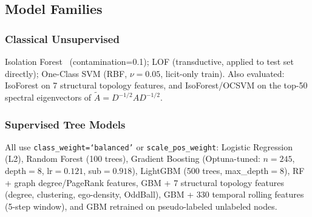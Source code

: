 \documentclass[conference]{IEEEtran}
\begin{document}
\begin{table}[htbp]
\centering
\caption{Per-Paradigm Training and Threshold Strategy}
\label{tab:eval_protocol}
\renewcommand{\arraystretch}{1.2}
\end{table}

\subsection{Model Families}

\subsubsection{Classical Unsupervised}
Isolation Forest~\cite{liu2008} (contamination=0.1); LOF (transductive,
applied to test set directly); One-Class SVM (RBF, $\nu{=}0.05$,
licit-only train).  Also evaluated: IsoForest on 7 structural topology
features, and IsoForest/OCSVM on the top-50 spectral eigenvectors of
$\tilde{A}=D^{-1/2}AD^{-1/2}$.

\subsubsection{Supervised Tree Models}
All use \texttt{class\_weight=`balanced'} or \texttt{scale\_pos\_weight}:
Logistic Regression (L2), Random Forest (100 trees), Gradient Boosting
(Optuna-tuned: $n{=}245$, depth$=8$, lr$=0.121$, sub$=0.918$), LightGBM
(500 trees, max\_depth$=8$), RF + graph degree/PageRank features, GBM +
7 structural topology features (degree, clustering, ego-density, OddBall),
GBM + 330 temporal rolling features (5-step window), and GBM retrained on
pseudo-labeled unlabeled nodes.
\end{document}
